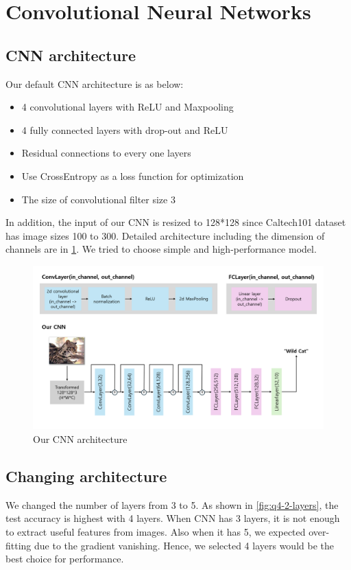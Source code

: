 \section{Convolutional Neural Networks}
\label{sec:intro}

\subsection{CNN architecture}
Our default CNN architecture is as below: 
\begin{itemize}
	\item 4 convolutional layers with ReLU and Maxpooling
	\item 4 fully connected layers with drop-out and ReLU
	\item Residual connections to every one layers
	\item Use CrossEntropy as a loss function for optimization
	\item The size of convolutional filter size 3
\end{itemize}
In addition, the input of our CNN is resized to 128*128 since Caltech101 dataset has image sizes 100 to 300. Detailed architecture including the dimension of channels are in \cref{fig:cnn_arch}. We tried to choose simple and high-performance model.
\begin{figure}[htbp]
	\centering
	\includegraphics[width=0.7\linewidth]{image/q4-1-arch.png}
	\caption{Our CNN architecture}
	\label{fig:cnn_arch}
\end{figure}

\subsection{Changing architecture}
We changed the number of layers from 3 to 5. As shown in \cref{fig:q4-2-layers}, the test accuracy is highest with 4 layers. When CNN has 3 layers, it is not enough to extract useful features from images. Also when it has 5, we expected over-fitting due to the gradient vanishing. Hence, we selected 4 layers would be the best choice for performance.


